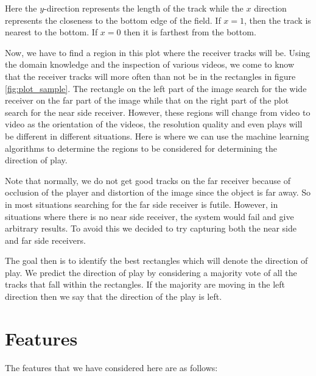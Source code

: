 \documentclass{article} %
\begin{document}
Here the $y$-direction represents the length of the track while the $x$ direction represents the closeness to the bottom edge of the field. If $x = 1$, then the track is nearest to the bottom. If $x = 0$ then it is farthest from the bottom.

Now, we have to find a region in this plot where the receiver tracks will be. Using the domain knowledge and the inspection of various videos, we come to know that the receiver tracks will more often than not be in the rectangles in figure \ref{fig:plot_sample}. The rectangle on the left part of the image search for the wide receiver on the far part of the image while that on the right part of the plot search for the near side receiver. However, these regions will change from video to video as the orientation of the videos, the resolution quality and even plays will be different in different situations. Here is where we can use the machine learning algorithms to determine the regions to be considered for determining the direction of play.

Note that normally, we do not get good tracks on the far receiver because of occlusion of the player and distortion of the image since the object is far away. So in most situations searching for the far side receiver is futile. However, in situations where there is no near side receiver, the system would fail and give arbitrary results. To avoid this we decided to try capturing both the near side and far side receivers.

The goal then is to identify the best rectangles which will denote the direction of play. We predict the direction of play by considering a majority vote of all the tracks that fall within the rectangles. If the majority are moving in the left direction then we say that the direction of the play is left.

\section{Features}

The features that we have considered here are as follows:
\end{document}
